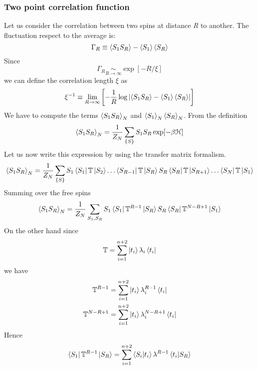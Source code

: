 \documentclass[../main/main.tex]{subfiles}
\begin{document}
\subsubsection{Two point correlation function}
Let us consider the correlation between two spins at distance \emph{R} to another. The fluctuation respect to the average is:
\begin{equation}
  \Gamma _R \equiv  \expval{S_1 S_R} - \expval{S_1}\expval{S_R}
\end{equation}
Since
\begin{equation}
  \Gamma _R \underset{R \rightarrow \infty }{\sim } \exp [-R/\xi ]
\end{equation}
we can define the correlation length \( \xi  \) as
\begin{equation}
  \xi^{-1} \equiv  \lim_{R \rightarrow \infty } \qty[ - \frac{1}{R} \log{ \qty| \expval{S_1 S_R} - \expval{S_1}\expval{S_R}| } ]
\end{equation}
We have to compute the terms \( \expval{S_1 S_R}_N  \) and \( \expval{S_1}_N\expval{S_R}_N \).
From the definition
\begin{equation}
  \expval{S_1 S_R}_N = \frac{1}{Z_N} \sum_{\{ S \}  }^{} S_1 S_R \exp [-\beta \mathcal{H}]
\end{equation}
Let us now write this expression by using the transfer matrix formalism.
\begin{equation}
\expval{S_1 S_R}_N  = \frac{1}{Z_N} \sum_{\{ S \}  }^{} S_1 \bra{S_1} \mathbb{T} \ket{S_2} \dots  \bra{S_{R-1}} \mathbb{T} \ket{S_R} S_R \bra{S_R} \mathbb{T} \ket{S_{R+1}} \dots \bra{S_N} \mathbb{T} \ket{S_1}
\end{equation}
Summing over the free spins
\begin{equation}
  \expval{S_1 S_R}_N = \frac{1}{Z_N} \sum_{S_1,S_R}^{} S_1 \bra{S_1} \mathbb{T}^{R-1} \ket{S_R} S_R \bra{S_R} \mathbb{T}^{N-R+1} \ket{S_1}
\end{equation}
On the other hand since
\begin{equation}
  \mathbb{T} = \sum_{i=1}^{n+2} \ket{t_i} \lambda _i  \bra{t_i}
\end{equation}
we have
\begin{subequations}
\begin{align}
  \mathbb{T}^{R-1} &= \sum_{i=1}^{n+2} \ket{t_i} \lambda _i^{R-1}  \bra{t_i} \\
    \mathbb{T}^{N-R+1} &= \sum_{i=1}^{n+2} \ket{t_i} \lambda _i^{N-R+1}  \bra{t_i}
\end{align}
\end{subequations}
Hence
\begin{equation}
  \bra{S_1} \mathbb{T}^{R-1} \ket{S_R} = \sum_{i=1}^{n+2} \braket{S_i}{t_i} \lambda ^{R-1} \braket{t_i}{S_R}
\end{equation}
\end{document}
